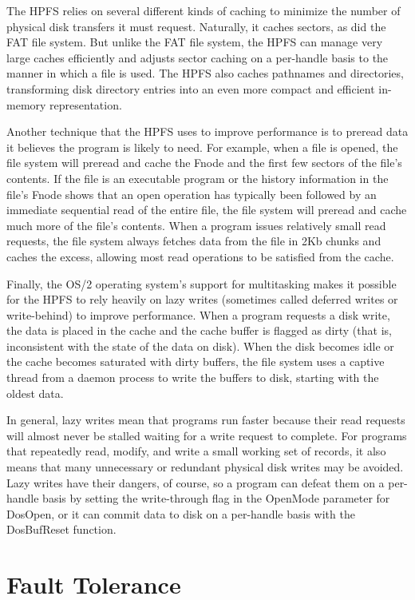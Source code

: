 The HPFS relies on several different kinds of caching to minimize the number
of physical disk transfers it must request.  Naturally, it caches sectors, as
did the FAT file system.  But unlike the FAT file system, the HPFS can manage
very large caches efficiently and adjusts sector caching on a per-handle basis
to the manner in which a file is used.  The HPFS also caches pathnames and
directories, transforming disk directory entries into an even more compact
and efficient in-memory representation.
 
Another technique that the HPFS uses to improve performance is to preread
data it believes the program is likely to need.  For example, when a file is
opened, the file system will preread and cache the Fnode and the first few
sectors of the file's contents. If the file is an executable program or the
history information in the file's Fnode shows that an open operation has
typically been followed by an immediate sequential read of the entire file,
the file system will preread and cache much more of the file's contents.
When a program issues relatively small read requests, the file system always
fetches data from the file in 2Kb chunks and caches the excess, allowing most
read operations to be satisfied from the cache.
 
Finally, the OS/2 operating system's support for multitasking makes it
possible for the HPFS to rely heavily on lazy writes (sometimes called
deferred writes or write-behind) to improve performance.  When a program
requests a disk write, the data is placed in the cache and the cache buffer
is flagged as dirty (that is, inconsistent with the state of the data on
disk).  When the disk becomes idle or the cache becomes saturated with dirty
buffers, the file system uses a captive thread from a daemon process to write
the buffers to disk, starting with the oldest data.
 
In general, lazy writes mean that programs run faster because their read
requests will almost never be stalled waiting for a write request to
complete.  For programs that repeatedly read, modify, and write a small
working set of records, it also means that many unnecessary or redundant
physical disk writes may be avoided.  Lazy writes have their dangers, of
course, so a program can defeat them on a per-handle basis by setting the
write-through flag in the OpenMode parameter for DosOpen, or it can commit
data to disk on a per-handle basis with the DosBufReset function.
 
\section{\heads Fault Tolerance}
 
